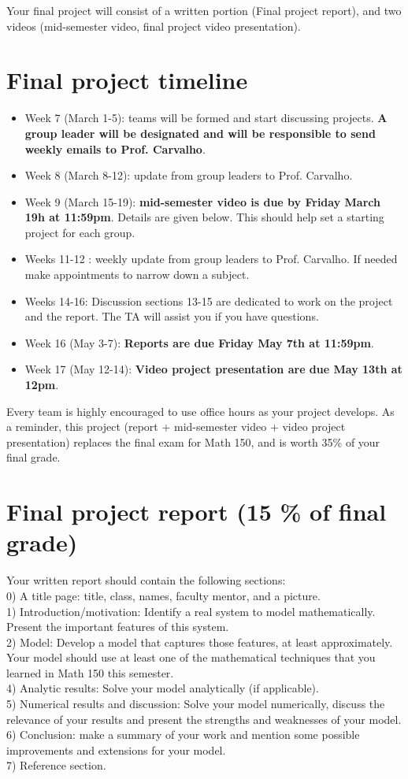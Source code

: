 \documentclass[11pt]{article}
\begin{document}
Your final project will consist of a written portion (Final project report), and two videos (mid-semester video, final project video presentation). 
\section{Final project timeline}

\begin{itemize}
\item Week 7 (March 1-5): teams will be formed and start discussing projects. \textbf{A group leader will be designated and will be responsible to send weekly emails to Prof. Carvalho}.
\item Week 8 (March 8-12): update from group leaders to Prof. Carvalho.
\item Week 9 (March 15-19): \textbf{mid-semester video is due by Friday March 19h at 11:59pm}. Details are given below. This should help set a starting project for each group.
\item Weeks 11-12 : weekly update from group leaders to Prof. Carvalho. If needed make appointments to narrow down a subject.
\item Weeks 14-16: Discussion sections 13-15 are dedicated to work on the project and the report. The TA will assist you if you have questions.
\item Week 16 (May 3-7): \textbf{Reports are due Friday May 7th at 11:59pm}.
\item Week 17 (May 12-14): \textbf{Video project presentation are due May 13th at 12pm}.
\end{itemize}

Every team is highly encouraged to use office hours as your project develops. As a reminder, this project (report + mid-semester video + video project presentation) replaces the final exam for Math 150, and is worth 35\% of your final grade. 

\section{Final project report (15 \% of final grade)}

Your written report should contain the following sections: \\
0) A title page: title, class, names, faculty mentor, and a picture.\\
1) Introduction/motivation: Identify a real system to model mathematically. Present the important features of this system. \\
2) Model: Develop a model that captures those features, at least approximately. Your model should use at least one of the mathematical techniques that you learned in Math 150 this semester. \\
4) Analytic results: Solve your model analytically (if applicable). \\
5) Numerical results and discussion: Solve your model  numerically, discuss the relevance of your results and present the strengths and weaknesses of your model. \\
6) Conclusion: make a summary of your work and mention some possible improvements and extensions for your model.\\
7) Reference section.
\end{document}
